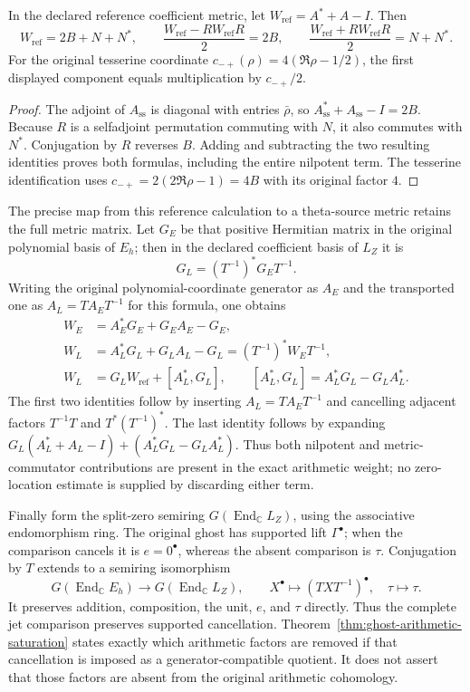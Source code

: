 \begin{proposition}
\label{prop:ghost-weight-crosswalk}
In the declared reference coefficient metric, let
$W_{\mathrm{ref}}=A^*+A-I$.  Then
\[
 W_{\mathrm{ref}}=2B+N+N^*,\qquad
 \frac{W_{\mathrm{ref}}-RW_{\mathrm{ref}}R}{2}=2B,\qquad
 \frac{W_{\mathrm{ref}}+RW_{\mathrm{ref}}R}{2}=N+N^*.
\]
For the original tesserine coordinate $c_{-+}(\rho)=4(\Re\rho-1/2)$,
the first displayed component equals multiplication by $c_{-+}/2$.
\end{proposition}
\begin{proof}
The adjoint of $A_{\mathrm{ss}}$ is diagonal with entries $\bar\rho$,
so $A_{\mathrm{ss}}^*+A_{\mathrm{ss}}-I=2B$.  Because $R$ is a
selfadjoint permutation commuting with $N$, it also commutes with $N^*$.
Conjugation by $R$ reverses $B$.  Adding and subtracting the two resulting
identities proves both formulas, including the entire nilpotent term.
The tesserine identification uses $c_{-+}=2(2\Re\rho-1)=4B$ with its
original factor $4$.
\end{proof}

The precise map from this reference calculation to a theta-source metric
retains the full metric matrix.  Let $G_E$ be that positive Hermitian
matrix in the original polynomial basis of $E_h$; then in the declared
coefficient basis of $L_Z$ it is
\[
 G_L=(T^{-1})^*G_E T^{-1}.
\]
Writing the original polynomial-coordinate generator as $A_E$ and the
transported one as $A_L=TA_ET^{-1}$ for this formula, one obtains
\[
 \begin{split}
 W_E&=A_E^*G_E+G_EA_E-G_E,\\
 W_L&=A_L^*G_L+G_LA_L-G_L=(T^{-1})^*W_E T^{-1},\\
 W_L&=G_LW_{\mathrm{ref}}+[A_L^*,G_L],
 \qquad [A_L^*,G_L]=A_L^*G_L-G_LA_L^*.
 \end{split}
\]
The first two identities follow by inserting $A_L=TA_ET^{-1}$ and
cancelling adjacent factors $T^{-1}T$ and $T^*(T^{-1})^*$.  The last
identity follows by expanding
$G_L(A_L^*+A_L-I)+(A_L^*G_L-G_LA_L^*)$.
Thus both nilpotent and metric-commutator contributions are present
in the exact arithmetic weight; no zero-location estimate is supplied
by discarding either term.

Finally form the split-zero semiring
$G(\operatorname{End}_{\mathbb C}L_Z)$, using the associative endomorphism
ring.  The original ghost has supported lift $\Gamma^\bullet$; when the
comparison cancels it is $e=0^\bullet$, whereas the absent comparison is
$\tau$.  Conjugation by $T$ extends to a semiring isomorphism
\[
 G(\operatorname{End}_{\mathbb C}E_h)
       \longrightarrow G(\operatorname{End}_{\mathbb C}L_Z),\qquad
 X^\bullet\longmapsto(TXT^{-1})^\bullet,\quad\tau\longmapsto\tau.
\]
It preserves addition, composition, the unit, $e$, and $\tau$ directly.
Thus the complete jet comparison preserves supported cancellation.
Theorem~\ref{thm:ghost-arithmetic-saturation} states exactly which
arithmetic factors are removed if that cancellation is imposed as a
generator-compatible quotient.  It does not assert that those factors
are absent from the original arithmetic cohomology.

